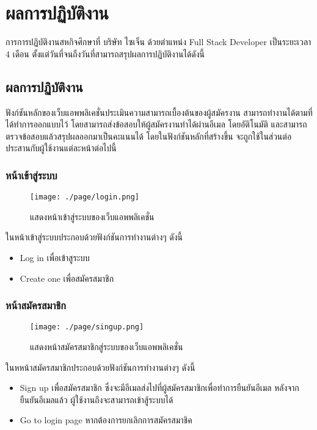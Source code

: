 \chapter{ผลการปฏิบัติงาน}
\label{chapter:result}

การการปฏิบัติงานสหกิจศึกษาที่ บริษัท ไซเจ็น ด้วยตำแหน่ง Full Stack Developer เป็นระยะเวลา 4 เดือน ตั้งแต่วันที่\StartDWork  จนถืงวันที่\EndDWork สามารถสรุปผลการปฏิบัติงานได้ดังนี้

\section{ผลการปฏิบัติงาน}

ฟังก์ชันหลักของเว็บแอพพลิเคชั่นประเมินความสามารถเบื้องต้นของผู้สมัครงาน สามารถทำงานได้ตามที่ได้ทำการออกแบบไว้ โดยสามารถส่งข้อสอบให้ผู้สมัครงานทำได้ผ่านอีเมล โดยอัติโนมัติ และสามารถตรวจข้อสอบแล้วสรุปผลออกมาเป็นคะแนนได้
โดยในฟังก์ชันหลักที่สร้างขึ้น จะถูกใช้ในส่วนต่อประสานกับผู้ใช้งานแต่ละหน้าต่อไปนี้

\subsection{หน้าเข้าสู่ระบบ}
\begin{figure}[H]
  \centering
  \texttt{[image: ./page/login.png]}
  \caption{แสดงหน้าเข้าสู่ระบบของเว็บแอพพลิเคชั่น}
  \label{Fig:Login}
\end{figure}
ในหน้าเข้าสู่ระบบประกอบด้วยฟังก์ชันการทำงานต่างๆ ดังนี้
\begin{itemize}
  \item Log in เพื่อเข้าสูระบบ
  \item Create one เพื่อสมัครสมาชิก
\end{itemize}

\subsection{หน้าสมัครสมาชิก}
\begin{figure}[H]
  \centering
  \texttt{[image: ./page/singup.png]}
  \caption{แสดงหน้าสมัครสมาชิกสู่ระบบของเว็บแอพพลิเคชั่น}
  \label{Fig:Register}
\end{figure}
ในหหน้าสมัครสมาชิกประกอบด้วยฟังก์ชันการทำงานต่างๆ ดังนี้
\begin{itemize}
  \item Sign up เพื่อสมัครสมาชิก ซึ่งจะมีอีเมลส่งไปที่ผู้สมัครสมาชิกเพื่อทำการยืนยันอีเมล หลังจากยืนยันอีเมลแล้ว ผู้ใช้งานถึงจะสามารถเข้าสู้ระบบได้
  \item Go to login page หากต้องการยกเลิกการสมัครสมาชิค
\end{itemize}

